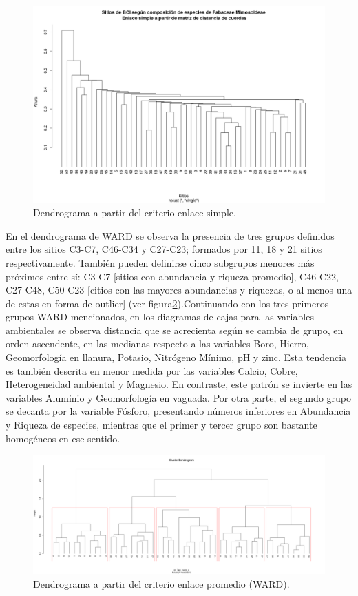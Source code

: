 \documentclass[11pt,]{article}
\begin{document}
\begin{figure}
\centering
\includegraphics[width=1.00000\textwidth]{DenSimple.png}
\caption{Dendrograma a partir del criterio enlace
simple.\label{fig:denS}}
\end{figure}

En el dendrograma de WARD se observa la presencia de tres grupos
definidos entre los sitios C3-C7, C46-C34 y C27-C23; formados por 11, 18
y 21 sitios respectivamente. También pueden definirse cinco subgrupos
menores más próximos entre sí: C3-C7 {[}sitios con abundancia y riqueza
promedio{]}, C46-C22, C27-C48, C50-C23 {[}citios con las mayores
abundancias y riquezas, o al menos una de estas en forma de outlier{]}
(ver figura\ref{fig:denW}).Continuando con los tres primeros grupos WARD
mencionados, en los diagramas de cajas para las variables ambientales se
observa distancia que se acrecienta según se cambia de grupo, en orden
ascendente, en las medianas respecto a las variables Boro, Hierro,
Geomorfología en llanura, Potasio, Nitrógeno Mínimo, pH y zinc. Esta
tendencia es también descrita en menor medida por las variables Calcio,
Cobre, Heterogeneidad ambiental y Magnesio. En contraste, este patrón se
invierte en las variables Aluminio y Geomorfología en vaguada. Por otra
parte, el segundo grupo se decanta por la variable Fósforo, presentando
números inferiores en Abundancia y Riqueza de especies, mientras que el
primer y tercer grupo son bastante homogéneos en ese sentido.

\begin{figure}
\centering
\includegraphics[width=1.00000\textwidth]{Inter_Ward_5Clusters_Dendrogram.png}
\caption{Dendrograma a partir del criterio enlace promedio
(WARD).\label{fig:denW}}
\end{figure}
\end{document}
